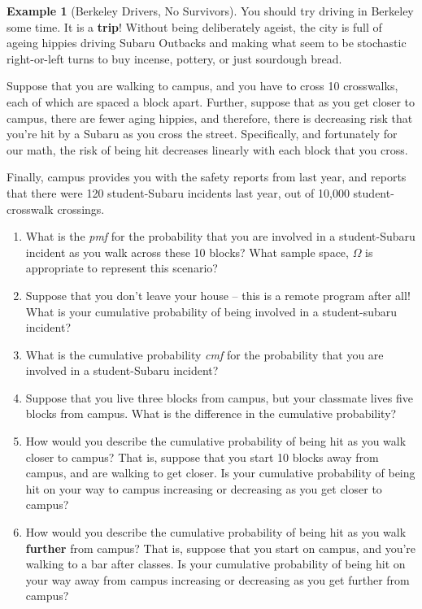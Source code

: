 \documentclass[
]{book}
\providecommand{\tightlist}{%
  \setlength{\itemsep}{0pt}\setlength{\parskip}{0pt}}
\theoremstyle{definition}
\theoremstyle{definition}
\newtheorem{example}{Example}[chapter]
\theoremstyle{definition}
\theoremstyle{definition}
\theoremstyle{remark}
\begin{document}
\begin{example}[Berkeley Drivers, No Survivors]

You should try driving in Berkeley some time. It is a \textbf{trip}! Without being deliberately ageist, the city is full of ageing hippies driving Subaru Outbacks and making what seem to be stochastic right-or-left turns to buy incense, pottery, or just sourdough bread.

Suppose that you are walking to campus, and you have to cross 10 crosswalks, each of which are spaced a block apart. Further, suppose that as you get closer to campus, there are fewer aging hippies, and therefore, there is decreasing risk that you're hit by a Subaru as you cross the street. Specifically, and fortunately for our math, the risk of being hit decreases linearly with each block that you cross.

Finally, campus provides you with the safety reports from last year, and reports that there were 120 student-Subaru incidents last year, out of 10,000 student-crosswalk crossings.

\begin{enumerate}
\def\labelenumi{\arabic{enumi}.}
\tightlist
\item
  What is the \emph{pmf} for the probability that you are involved in a student-Subaru incident as you walk across these 10 blocks? What sample space, \(\Omega\) is appropriate to represent this scenario?
\item
  Suppose that you don't leave your house -- this is a remote program after all! What is your cumulative probability of being involved in a student-subaru incident?\\
\item
  What is the cumulative probability \emph{cmf} for the probability that you are involved in a student-Subaru incident?
\item
  Suppose that you live three blocks from campus, but your classmate lives five blocks from campus. What is the difference in the cumulative probability?
\item
  How would you describe the cumulative probability of being hit as you walk closer to campus? That is, suppose that you start 10 blocks away from campus, and are walking to get closer. Is your cumulative probability of being hit on your way to campus increasing or decreasing as you get closer to campus?
\item
  How would you describe the cumulative probability of being hit as you walk \textbf{further} from campus? That is, suppose that you start on campus, and you're walking to a bar after classes. Is your cumulative probability of being hit on your way away from campus increasing or decreasing as you get further from campus?
\end{enumerate}

\end{example}
\end{document}
